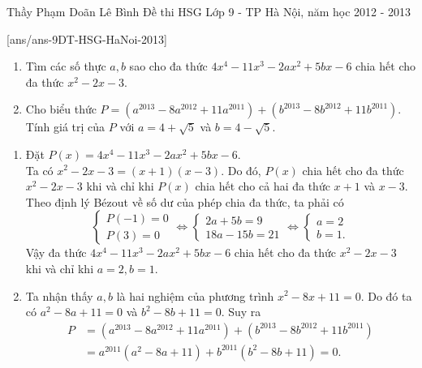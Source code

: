 
\begin{name}
{Thầy  Phạm Doãn Lê Bình}
{Đề thi HSG Lớp 9 - TP Hà Nội, năm học 2012 - 2013}
\end{name}
\setcounter{ex}{0}
[ans/ans-9DT-HSG-HaNoi-2013]
\begin{ex}
    \begin{enumerate}
    \item Tìm các số thực $a,b$ sao cho đa thức $4x^4 - 11x^3 - 2ax^2 + 5bx - 6$ chia hết cho đa thức $x^2 - 2x - 3$.
    \item Cho biểu thức $P = \left(a^{2013} -8a^{2012} + 11a^{2011}\right) + \left(b^{2013} - 8b^{2012} + 11b^{2011} \right)$. Tính giá trị của $P$ với $a=4+\sqrt{5}$ và $b=4-\sqrt{5}$.
    \end{enumerate}
\loigiai
    {
    \begin{enumerate}
    \item Đặt $P(x) = 4x^4 - 11x^3 - 2ax^2 + 5bx - 6$.\\
    Ta có $x^2 - 2x - 3 = (x+1)(x-3)$. Do đó, $P(x)$ chia hết cho đa thức $x^2 - 2x - 3$ khi và chỉ khi $P(x)$ chia hết cho cả hai đa thức $x+1$ và $x-3$. Theo định lý Bézout về số dư của phép chia đa thức, ta phải có 
    	$$\begin{cases} P(-1) = 0 \\ P(3) = 0 \end{cases} 
    	\Leftrightarrow \begin{cases} 2a + 5b = 9 \\ 18a - 15b = 21 \end{cases}
    	\Leftrightarrow \begin{cases} a = 2 \\ b = 1. \end{cases}$$
    Vậy đa thức $4x^4 - 11x^3 - 2ax^2 + 5bx - 6$ chia hết cho đa thức $x^2 - 2x - 3$ khi và chỉ khi $a = 2, b = 1$.
    \item Ta nhận thấy $a,b$ là hai nghiệm của phương trình $x^2 - 8x + 11 = 0$. Do đó ta có $a^2 - 8a + 11 = 0$ và $b^2 - 8b + 11 = 0$. Suy ra
    	\begin{align*}
    	P & = \left(a^{2013} -8a^{2012} + 11a^{2011}\right) + \left(b^{2013} - 8b^{2012} + 11b^{2011} \right)\\
    	& = a^{2011} \left( a^2 - 8a + 11 \right) + b^{2011} \left( b^2 - 8b + 11 \right) = 0.
    	\end{align*}
    \end{enumerate}
    }
\end{ex}

